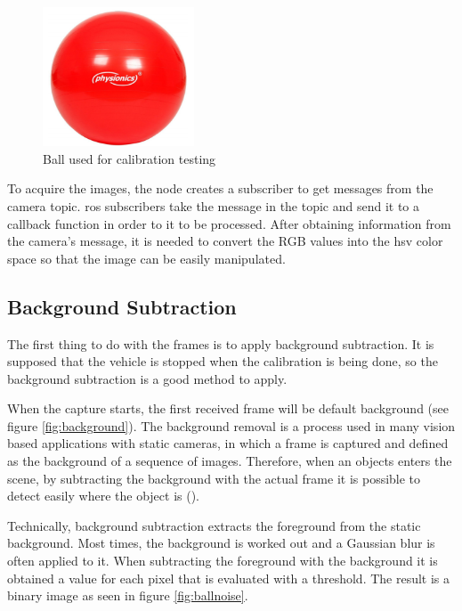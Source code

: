 \begin{figure}[htp]
	
	\centering
	\includegraphics[width=0.4\textwidth]{capcalib/imgs/ball.png}
	
	\caption{Ball used for calibration testing}
	\label{fig:ball}
	
\end{figure}

To acquire the images, the node creates a subscriber to get messages from the camera topic. \gls{ros} subscribers take the message in the topic and send it to a callback function in order to it to be processed. After obtaining information from the camera's message, it is needed to convert the RGB values into the \gls{hsv} color space so that the image can be easily manipulated.

\subsection{Background Subtraction}

The first thing to do with the frames is to apply background subtraction. It is supposed that the vehicle is stopped when the calibration is being done, so the background subtraction is a good method to apply.

When the capture starts, the first received frame will be default background (see figure \ref{fig:background}). The background removal is a process used in many vision based applications with static cameras, in which a frame is captured and defined as the background of a sequence of images. Therefore, when an objects enters the scene, by subtracting the background with the actual frame it is possible to detect easily where the object is (\cite{OpenCV}).

Technically, background subtraction extracts the foreground from the static background. Most times, the background is worked out and a Gaussian blur is often applied to it. When subtracting the foreground with the background it is obtained a value for each pixel that is evaluated with a threshold. The result is a binary image as seen in figure \ref{fig:ballnoise}.

